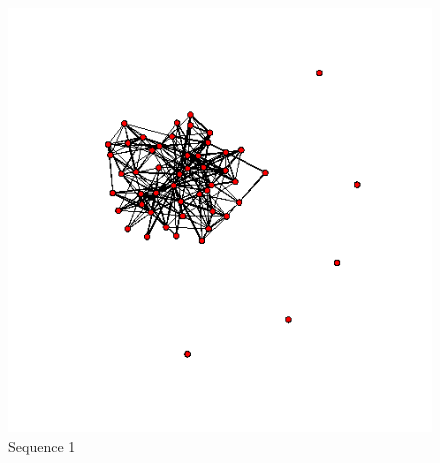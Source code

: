 \documentclass[aspectratio=169,ignorenonframetext,9pt]{beamer}
\theoremstyle{plain}
\theoremstyle{definition}
\begin{document}
\begin{figure}[h]
\begin{center}
    \includegraphics[scale=0.23]{pictures/f1_19_nework.png}
    \caption{Sequence 1}
    \end{center}
\end{figure}
\end{document}
